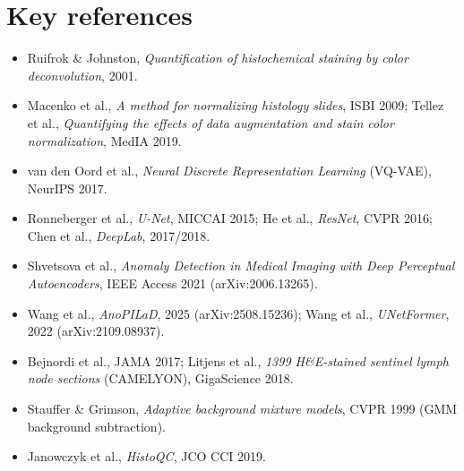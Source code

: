\section{Key references}
\begin{itemize}
\item Ruifrok \& Johnston, \emph{Quantification of histochemical staining by color deconvolution}, 2001.
\item Macenko et al., \emph{A method for normalizing histology slides}, ISBI 2009; Tellez et al., \emph{Quantifying the effects of data augmentation and stain color normalization}, MedIA 2019.
\item van den Oord et al., \emph{Neural Discrete Representation Learning} (VQ-VAE), NeurIPS 2017.
\item Ronneberger et al., \emph{U-Net}, MICCAI 2015; He et al., \emph{ResNet}, CVPR 2016; Chen et al., \emph{DeepLab}, 2017/2018.
\item Shvetsova et al., \emph{Anomaly Detection in Medical Imaging with Deep Perceptual Autoencoders}, IEEE Access 2021 (arXiv:2006.13265).
\item Wang et al., \emph{AnoPILaD}, 2025 (arXiv:2508.15236); Wang et al., \emph{UNetFormer}, 2022 (arXiv:2109.08937).
\item Bejnordi et al., JAMA 2017; Litjens et al., \emph{1399 H\&E-stained sentinel lymph node sections} (CAMELYON), GigaScience 2018.
\item Stauffer \& Grimson, \emph{Adaptive background mixture models}, CVPR 1999 (GMM background subtraction).
\item Janowczyk et al., \emph{HistoQC}, JCO CCI 2019.
\end{itemize}
